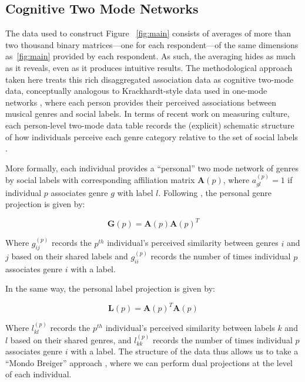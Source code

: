 \documentclass[12pt]{article}
\begin{document}
\subsection*{Cognitive Two Mode Networks}
The data used to construct Figure ~\ref{fig:main} consists of averages of more than two thousand binary matrices---one for each respondent---of the same dimensions as~\ref{fig:main} provided by each respondent. As such, the averaging hides as much as it reveals, even as it produces intuitive results. The methodological approach taken here treats this rich disaggregated association data as cognitive two-mode data, conceptually analogous to Krackhardt-style data used in one-mode networks \citep{batchelder1997consensus-f5c, kumbasar1994systematic-213}, where each person provides their perceived associations between musical genres and social labels. In terms of recent work on measuring culture, each person-level two-mode data table records the (explicit) schematic structure of how individuals perceive each genre category relative to the set of social labels \citep{hunzaker2019mapping-280}.

More formally, each individual provides a ``personal'' two mode network of genres by social labels with corresponding affiliation matrix $\mathbf{A}(p)$, where $a^{(p)}_{gl} = 1$ if individual $p$ associates genre $g$ with label $l$. Following \citet{breiger1974duality-1d0}, the personal genre projection is given by:

\begin{equation}
   \mathbf{G}(p) = \mathbf{A}(p)\mathbf{A}(p)^T 
\end{equation}

Where $g^{(p)}_{ij}$ records the $p^{th}$ individual's perceived similarity between genres $i$ and $j$ based on their shared labels and $g^{(p)}_{ii}$ records the number of times individual $p$ associates genre $i$ with a label.

In the same way, the personal label projection is given by:

\begin{equation}
    \mathbf{L}(p) = \mathbf{A}(p)^T\mathbf{A}(p)
\end{equation}
 
Where $l^{(p)}_{kl}$ records the $p^{th}$ individual's perceived similarity between labels $k$ and $l$ based on their shared genres, and $l^{(p)}_{kk}$ records the number of times individual $p$ associates genre $i$ with a label. The structure of the data thus allows us to take a ``Mondo Breiger'' approach \citep{lee2018doorway-008}, where we can perform dual projections at the level of each individual. 
\end{document}
